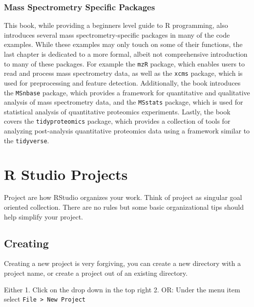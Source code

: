 \documentclass[
]{book}
\begin{document}
\hypertarget{mass-spectrometry-specific-packages}{%
\subsection*{Mass Spectrometry Specific Packages}\label{mass-spectrometry-specific-packages}}

This book, while providing a beginners level guide to R programming, also introduces several mass spectrometry-specific packages in many of the code examples. While these examples may only touch on some of their functions, the last chapter is dedicated to a more formal, albeit not comprehensive introduction to many of these packages. For example the \texttt{mzR} package, which enables users to read and process mass spectrometry data, as well as the \texttt{xcms} package, which is used for preprocessing and feature detection. Additionally, the book introduces the \texttt{MSnbase} package, which provides a framework for quantitative and qualitative analysis of mass spectrometry data, and the \texttt{MSstats} package, which is used for statistical analysis of quantitative proteomics experiments. Lastly, the book covers the \texttt{tidyproteomics} package, which provides a collection of tools for analyzing post-analysis quantitative proteomics data using a framework similar to the \texttt{tidyverse}.

\hypertarget{r-studio-projects}{%
\chapter{R Studio Projects}\label{r-studio-projects}}

Project are how RStudio organizes your work. Think of project as singular goal oriented collection. There are no rules but some basic organizational tips should help simplify your project.

\hypertarget{creating}{%
\section{Creating}\label{creating}}

Creating a new project is very forgiving, you can create a new directory with a project name, or create a project out of an existing directory.

Either 1. Click on the drop down in the top right 2. OR: Under the menu item select \texttt{File\ \textgreater{}\ New\ Project}
\end{document}

